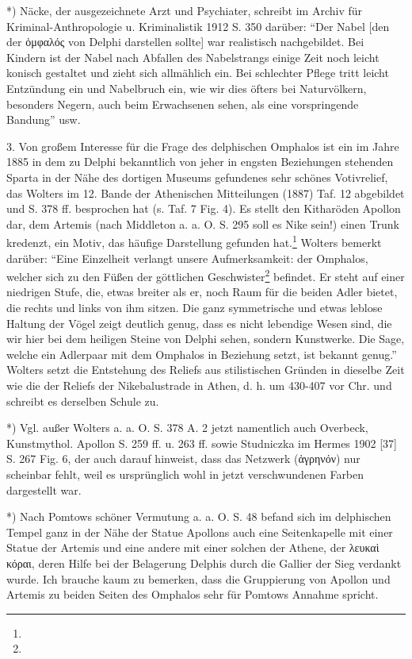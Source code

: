 \documentclass[a4paper, 11pt, oneside]{article}
\begin{document}
*) Näcke, der ausgezeichnete Arzt und Psychiater, schreibt im Archiv für Kriminal-Anthropologie u. Kriminalistik 1912 S. 350 darüber: "`Der Nabel [den der ὀμφαλός von Delphi darstellen sollte] war realistisch nachgebildet. Bei Kindern ist der Nabel nach Abfallen des Nabelstrangs einige Zeit noch leicht konisch gestaltet und zieht sich allmählich ein. Bei schlechter Pflege tritt leicht Entzündung ein und Nabelbruch ein, wie wir dies öfters bei Naturvölkern, besonders Negern, auch beim Erwachsenen sehen, als eine vorspringende Bandung"' usw.

3. Von großem Interesse für die Frage des delphischen Omphalos ist ein im Jahre 1885 in dem zu Delphi bekanntlich von jeher in engsten Beziehungen stehenden Sparta in der Nähe des dortigen Museums gefundenes sehr schönes Votivrelief, das Wolters im 12. Bande der Athenischen Mitteilungen (1887) Taf. 12 abgebildet und S. 378 ff. besprochen hat (s. Taf. 7 Fig. 4). Es stellt den Kitharöden Apollon dar, dem Artemis (nach Middleton a. a. O. S. 295 soll es Nike sein!) einen Trunk kredenzt, ein Motiv, das häufige Darstellung gefunden hat.\footnote{} Wolters bemerkt darüber: "`Eine Einzelheit verlangt unsere Aufmerksamkeit: der Omphalos, welcher sich zu den Füßen der göttlichen Geschwister\footnote{} befindet. Er steht auf einer niedrigen Stufe, die, etwas breiter als er, noch Raum für die beiden Adler bietet, die rechts und links von ihm sitzen. Die ganz symmetrische und etwas leblose Haltung der Vögel zeigt deutlich genug, dass es nicht lebendige Wesen sind, die wir hier bei dem heiligen Steine von Delphi sehen, sondern Kunstwerke. Die Sage, welche ein Adlerpaar mit dem Omphalos in Beziehung setzt, ist bekannt genug."' Wolters setzt die Entstehung des Reliefs aus stilistischen Gründen in dieselbe Zeit wie die der Reliefs der Nikebalustrade in Athen, d. h. um 430-407 vor Chr. und schreibt es derselben Schule zu.

*) Vgl. außer Wolters a. a. O. S. 378 A. 2 jetzt namentlich auch Overbeck, Kunstmythol. Apollon S. 259 ff. u. 263 ff. sowie Studniczka im Hermes 1902 [37] S. 267 Fig. 6, der auch darauf hinweist, dass das Netzwerk (ἀγρηνόν) nur scheinbar fehlt, weil es ursprünglich wohl in jetzt verschwundenen Farben dargestellt war.

*) Nach Pomtows schöner Vermutung a. a. O. S. 48 befand sich im delphischen Tempel ganz in der Nähe der Statue Apollons auch eine Seitenkapelle mit einer Statue der Artemis und eine andere mit einer solchen der Athene, der λευκαὶ κόραι, deren Hilfe bei der Belagerung Delphis durch die Gallier der Sieg verdankt wurde. Ich brauche kaum zu bemerken, dass die Gruppierung von Apollon und Artemis zu beiden Seiten des Omphalos sehr für Pomtows Annahme spricht.
\end{document}
